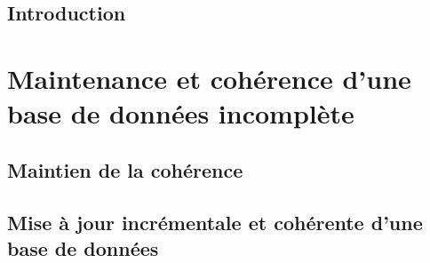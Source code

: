\pagestyle{fancy}


\frontmatter




\dominitoc
\tableofcontents
{}
\listoffigures
{}
\listoftables

\mainmatter

\chapter{Introduction}
\label{chp:intro}
\minitoc



\part{Maintenance et cohérence d'une base de données incomplète}
\label{part:update}
\glsresetall


\chapter{Maintien de la cohérence}
\label{chp:update:intro}
\minitoc


\chapter{Mise à jour incrémentale et cohérente d'une base de données}
\label{chp:update:algos}
\minitoc




